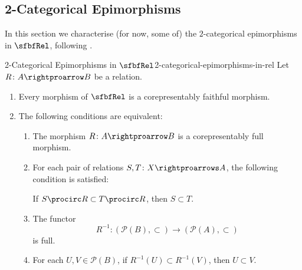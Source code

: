\subsection{2-Categorical Epimorphisms}\label{subsection-2-categorical-epimorphisms-in-rel}
In this section we characterise (for now, some of) the $2$-categorical epimorphisms in $\sfbfRel$, following .
\begin{proposition}{2-Categorical Epimorphisms in $\sfbfRel$}{2-categorical-epimorphisms-in-rel}%
    Let $R\colon A\rightproarrow B$ be a relation.
    \begin{enumerate}
        \item\label{2-categorical-epimorphisms-in-rel-corepresentably-faithful-morphisms-in-rel}Every morphism of $\sfbfRel$ is a corepresentably faithful morphism.
        \item\label{2-categorical-epimorphisms-in-rel-corepresentably-full-morphisms-in-rel}The following conditions are equivalent:
            \begin{enumerate}
                \item\label{2-categorical-epimorphisms-in-rel-corepresentably-full-morphisms-in-rel-1}The morphism $R\colon A\rightproarrow B$ is a corepresentably full morphism.
                \item\label{2-categorical-epimorphisms-in-rel-corepresentably-full-morphisms-in-rel-2}For each pair of relations $S,T\colon X\rightproarrows A$, the following condition is satisfied:
                    \begin{itemize}
                        \itemstar If $S\procirc R\subset T\procirc R$, then $S\subset T$.
                    \end{itemize}
                \item\label{2-categorical-epimorphisms-in-rel-corepresentably-full-morphisms-in-rel-3}The functor
                    \[
                        R^{-1}%
                        \colon%
                        (\mathcal{P}(B),\subset)%
                        \to%
                        (\mathcal{P}(A),\subset)%
                    \]%
                    is full.
                \item\label{2-categorical-epimorphisms-in-rel-corepresentably-full-morphisms-in-rel-4}For each $U,V\in\mathcal{P}(B)$, if $R^{-1}(U)\subset R^{-1}(V)$, then $U\subset V$.

\end{enumerate}
\end{enumerate}
\end{proposition}
